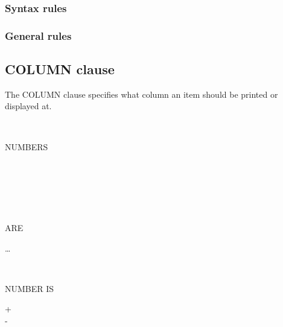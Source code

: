 \subsubsection{Syntax rules}

\subsubsection{General rules}

\subsection{COLUMN clause}

The COLUMN clause specifies what column an item should be printed or displayed at.

\begin{syntax}
  \begin{1=}
    \begin{1=}
       \\
    \end{1=}
    NUMBERS
    \begin{0-1}
       \\
    \end{0-1} \\

    \begin{1=}
       \\
    \end{1=}
    ARE
  \end{1=}
  \begin{1=}
    \begin{0-1}
    \end{0-1}
    \integer
  \end{1=}
  \ldots
\end{syntax}

\begin{syntax}
  \begin{1=}
     \\
  \end{1=}
  NUMBER IS
  \begin{0-1}
    + \\
    - \\
     \\
  \end{0-1}
  \begin{1=}
    \identifier \\
    \integer
  \end{1=}
\end{syntax}

